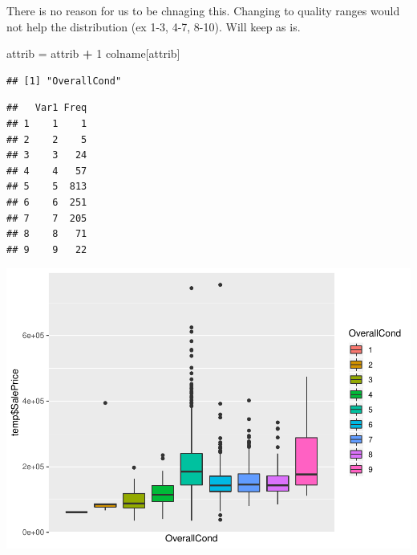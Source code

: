 \documentclass[]{article}
\newenvironment{Shaded}{\begin{snugshade}}{\end{snugshade}}
\newcommand{\KeywordTok}[1]{\textcolor[rgb]{0.13,0.29,0.53}{\textbf{#1}}}
\newcommand{\DataTypeTok}[1]{\textcolor[rgb]{0.13,0.29,0.53}{#1}}
\newcommand{\DecValTok}[1]{\textcolor[rgb]{0.00,0.00,0.81}{#1}}
\newcommand{\StringTok}[1]{\textcolor[rgb]{0.31,0.60,0.02}{#1}}
\newcommand{\CommentTok}[1]{\textcolor[rgb]{0.56,0.35,0.01}{\textit{#1}}}
\newcommand{\ControlFlowTok}[1]{\textcolor[rgb]{0.13,0.29,0.53}{\textbf{#1}}}
\newcommand{\OperatorTok}[1]{\textcolor[rgb]{0.81,0.36,0.00}{\textbf{#1}}}
\newcommand{\NormalTok}[1]{#1}
\begin{document}
There is no reason for us to be chnaging this. Changing to quality
ranges would not help the distribution (ex 1-3, 4-7, 8-10). Will keep as
is.

\begin{Shaded}
\begin{Highlighting}[]
\NormalTok{attrib =}\StringTok{ }\NormalTok{attrib }\OperatorTok{+}\StringTok{ }\DecValTok{1}
\NormalTok{colname[attrib]}
\end{Highlighting}
\end{Shaded}

\begin{verbatim}
## [1] "OverallCond"
\end{verbatim}

\begin{Shaded}
\end{Shaded}

\begin{verbatim}
##   Var1 Freq
## 1    1    1
## 2    2    5
## 3    3   24
## 4    4   57
## 5    5  813
## 6    6  251
## 7    7  205
## 8    8   71
## 9    9   22
\end{verbatim}

\includegraphics{EDA_files/figure-latex/unnamed-chunk-41-1.pdf}
\end{document}
